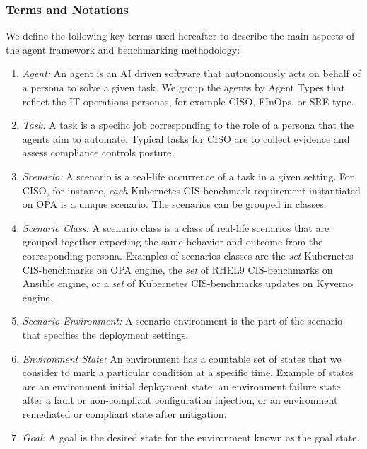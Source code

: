\subsubsection{Terms and Notations}
 We define the following key terms used hereafter to describe the main aspects of the agent framework and benchmarking methodology:

\begin{enumerate}
    \item \emph{Agent:} An agent is an AI driven software that autonomously acts on behalf of a persona to solve a given task. We group the agents by Agent Types that reflect the IT operations personas, for example CISO, FInOps, or SRE type.   
    
    \item \emph{Task:} A task is a specific job corresponding to the role of a persona that the agents aim to automate. Typical tasks for CISO are to collect evidence and assess compliance controls posture.

    \item \emph{Scenario:} A scenario is a real-life occurrence of a task in a given setting. For CISO, for instance, \textit{each} Kubernetes CIS-benchmark requirement instantiated on OPA is a unique scenario. The scenarios can be grouped in classes. 
 
    \item \emph{Scenario Class:} A scenario class is a class of real-life scenarios that are grouped together expecting the same behavior and outcome from the corresponding persona. Examples of scenarios classes are the \textit{set} Kubernetes CIS-benchmarks on OPA engine, the \textit{set} of RHEL9 CIS-benchmarks on Ansible engine, or a \textit{set} of Kubernetes CIS-benchmarks updates on Kyverno engine.

    \item \emph{Scenario Environment:} A scenario environment is the part of the scenario that specifies the deployment settings. 
    

    \item \emph{Environment State:} An environment has a countable set of states that we consider to mark a particular condition at a specific time. Example of states are an environment initial deployment state, an environment failure state after a fault or non-compliant configuration injection, or an environment remediated or compliant state after mitigation. 

    \item \emph{Goal:} A goal is the desired state for the environment known as the goal state.
\end{enumerate}
    

